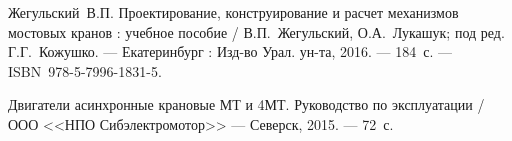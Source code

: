 \begin{thebibliography}{999}

	 Жегульский~В.П. Проектирование, конструирование и расчет механизмов мостовых кранов : учебное пособие / В.П.~Жегульский, О.А.~Лукашук; под ред. Г.Г.~Кожушко. --- Екатеринбург : Изд-во Урал. ун-та, 2016. --- 184~с. --- ISBN~978-5-7996-1831-5.

	 Двигатели асинхронные крановые МТ и 4МТ. Руководство по эксплуатации / ООО <<НПО Сибэлектромотор>> --- Северск, 2015. --- 72~с.

\end{thebibliography}
